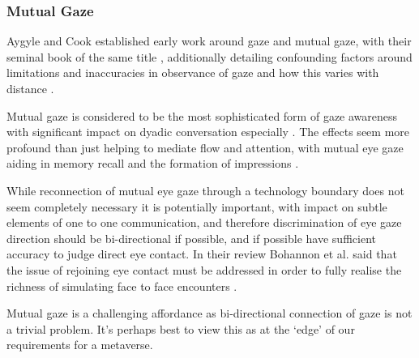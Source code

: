 \subsubsection{Mutual Gaze}
Aygyle and Cook established early work around gaze and mutual gaze, with their seminal book of the same title \cite{Argyle1976}, additionally detailing confounding factors around limitations and inaccuracies in observance of gaze and how this varies with distance \cite{Argyle1969, Argyle1988, Cook1977}.\par
Mutual gaze is considered to be the most sophisticated form of gaze awareness with significant impact on dyadic conversation especially \cite{Cook1977, Kleinke1986, Fagel2010}. The effects seem more profound than just helping to mediate flow and attention, with mutual eye gaze aiding in memory recall and the formation of impressions \cite{Bohannon2013}.\par
While reconnection of mutual eye gaze through a technology boundary does not seem completely necessary it is potentially important, with impact on subtle elements of one to one communication, and therefore discrimination of eye gaze direction should be bi-directional if possible, and if possible have sufficient accuracy to judge direct eye contact. In their review Bohannon et al. said that the issue of rejoining eye contact must be addressed in order to fully realise the richness of simulating face to face encounters \cite{Bohannon2013}.\par
Mutual gaze is a challenging affordance as bi-directional connection of gaze is not a trivial problem. It's perhaps best to view this as at the `edge' of our requirements for a metaverse.
